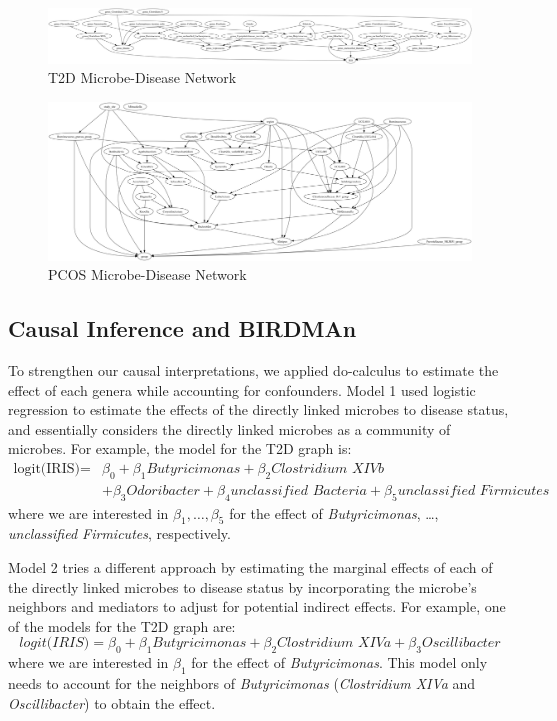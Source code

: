 \documentclass[12pt,letterpaper]{article}
\begin{document}
\begin{figure}[h!]
  \centering
  \includegraphics[width=\linewidth]{../graphs/t2d/cdnod_norm.png}
  \caption{T2D Microbe-Disease Network}
  \label{fig:t2dcdnod}
\end{figure}

\begin{figure}[h!]
  \centering
  \includegraphics[width=\linewidth]{../graphs/pcos/cdnod_norm.png}
  \caption{PCOS Microbe-Disease Network}
  \label{fig:pcoscdnod}
\end{figure}

\subsection{Causal Inference and BIRDMAn}

To strengthen our causal interpretations, we applied do-calculus to estimate the effect of each genera while accounting for confounders. Model 1 used logistic regression to estimate the effects of the directly linked microbes to disease status, and essentially considers the directly linked microbes as a community of microbes. For example, the model for the T2D graph is: \begin{align*}\text{logit(IRIS)} = &\beta_0 + \beta_1 \textit{Butyricimonas} + \beta_2 \textit{Clostridium XIVb}\\ &+ \beta_3 \textit{Odoribacter} + \beta_4 \textit{unclassified Bacteria} + \beta_5 \textit{unclassified Firmicutes}\end{align*}
where we are interested in $\beta_1, \dots, \beta_5$ for the effect of \textit{Butyricimonas}, …, \textit{unclassified Firmicutes}, respectively.

Model 2 tries a different approach by estimating the marginal effects of each of the directly linked microbes to disease status by incorporating the microbe’s neighbors and mediators to adjust for potential indirect effects. For example, one of the models for the T2D graph are: \[\textit{logit(IRIS)} = \beta_0 + \beta_1 \textit{Butyricimonas} + \beta_2 \textit{Clostridium XIVa} + \beta_3 \textit{Oscillibacter}\]
where we are interested in $\beta_1$ for the effect of \textit{Butyricimonas}. This model only needs to account for the neighbors of \textit{Butyricimonas} (\textit{Clostridium XIVa} and \textit{Oscillibacter}) to obtain the effect. 
\end{document}
